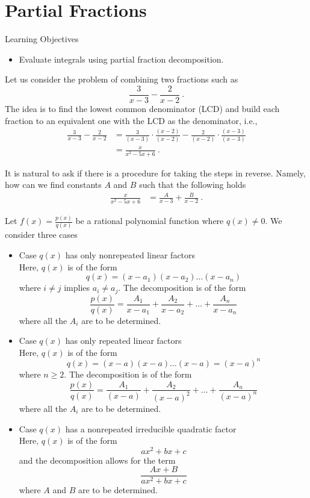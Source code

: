 \documentclass[compacto,10pt,comentarios]{aleph-notas}
\begin{document}
\encabezado

\section*{Partial Fractions}
\begin{mdframed}
    \center Learning Objectives \\
    \begin{itemize}
        \item Evaluate integrals using partial fraction decomposition.
    \end{itemize}
\end{mdframed}

Let us consider the problem of combining two fractions such as
$$
    \frac{3}{x - 3} - \frac{2}{x - 2} ~ .
$$
The idea is to find the lowest common denominator (LCD) and build each fraction to an equivalent one with the LCD as the denominator, i.e.,
\begin{align*}
    \frac{3}{x - 3} - \frac{2}{x - 2} 
    & = \frac{3}{(x - 3)} \cdot \frac{(x - 2)}{(x - 2)} -  \frac{2}{(x - 2)} \cdot \frac{(x - 3)}{(x - 3)} \\
    & = \frac{x}{x^{2} -5x + 6} ~ .
\end{align*}

It is natural to ask if there is a procedure for taking the steps in reverse. Namely, how can we find constants $A$ and $B$ such that the following holds
\begin{align*}
    \frac{x}{x^{2} -5x + 6}
    & = \frac{A}{x - 3} + \frac{B}{x - 2} ~ .
\end{align*}

Let $f(x) = \frac{p(x)}{q(x)}$ be a rational polynomial function where $q(x) \neq 0$. We consider three cases
\begin{itemize}
    \item Case $q(x)$ has only nonrepeated linear factors \\
    Here, $q(x)$ is of the form
    $$
        q(x) = (x - a_1) (x - a_2) \ldots (x - a_n)
    $$
    where $i \neq j$ implies $a_i \neq a_j$. The decomposition is of the form
    $$
        \frac{p(x)}{q(x)} = \frac{A_1}{x-a_1} + \frac{A_2}{x - a_2} + \ldots + \frac{A_n}{x-a_n}
    $$
    where all the $A_i$ are to be determined.

    \item Case $q(x)$ has only repeated linear factors \\
    Here, $q(x)$ is of the form
    $$
        q(x) = (x - a) (x - a) \ldots (x - a) = (x - a)^{n}
    $$
    where $n \geq 2$. The decomposition is of the form
    $$
        \frac{p(x)}{q(x)} = \frac{A_1}{(x-a)} + \frac{A_2}{(x - a)^2} + \ldots + \frac{A_n}{(x-a)^n}
    $$
    where all the $A_i$ are to be determined.

    \item Case $q(x)$ has a nonrepeated irreducible quadratic factor \\
    Here, $q(x)$ is of the form
    $$
    ax^{2} + bx + c
    $$ 
    and the decomposition allows for the term
    $$
        \frac{Ax+B}{ax^{2} + bx + c}
    $$
    where $A$ and $B$ are to be determined.
\end{itemize}
\end{document}
